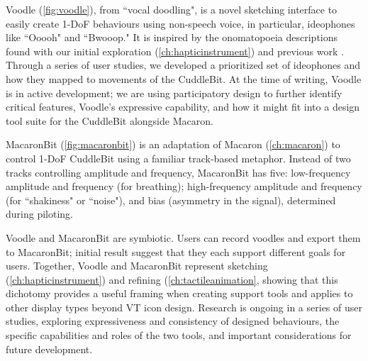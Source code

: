 Voodle (\autoref{fig:voodle}), from ``vocal doodling", is a novel sketching interface to easily create 1-DoF behaviours using non-speech voice, in particular, ideophones \cite{Dingemanse2012} like ``Ooooh" and ``Bwooop."
It is inspired by the onomatopoeia descriptions found with our initial exploration (\autoref{ch:hapticinstrument}) and previous work \cite{Seifi2015,Watanabe2012}.
Through a series of user studies, we developed a prioritized set of ideophones and how they mapped to movements of the CuddleBit.
At the time of writing, Voodle is in active development; we are using participatory design to further identify critical features, Voodle's expressive capability, and how it might fit into a design tool suite for the CuddleBit alongside Macaron.

MacaronBit (\autoref{fig:macaronbit}) is an adaptation of Macaron (\autoref{ch:macaron}) to control 1-DoF CuddleBit using a familiar track-based metaphor.
Instead of two tracks controlling amplitude and frequency, MacaronBit has five: low-frequency amplitude and frequency (for breathing); high-frequency amplitude and frequency (for ``shakiness" or ``noise"), and bias (asymmetry in the signal), determined during piloting.

Voodle and MacaronBit are symbiotic.
Users can record voodles and export them to MacaronBit; initial result suggest that they each support different goals for users.
Together, Voodle and MacaronBit represent sketching (\autoref{ch:hapticinstrument}) and refining (\autoref{ch:tactileanimation}, showing that this dichotomy provides a useful framing when creating \haxd support tools and applies to other display types beyond VT icon design.
Research is ongoing in a series of user studies, exploring expressiveness and consistency of designed behaviours, the specific capabilities and roles of the two tools, and important considerations for future development.


\endinput
